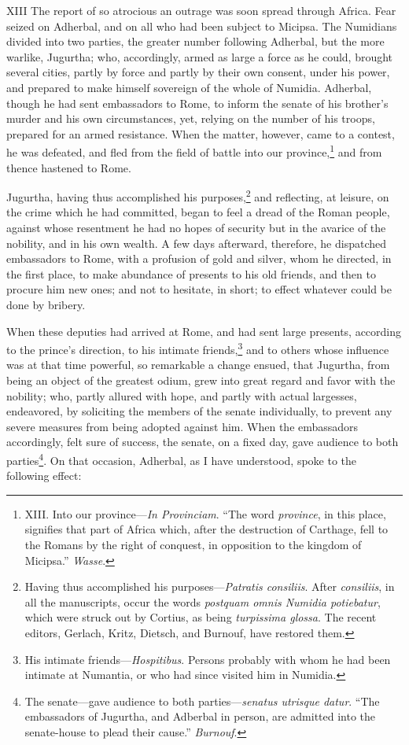 XIII The report of so atrocious an outrage was soon spread through
Africa. Fear seized on Adherbal, and on all who had been subject to
Micipsa. The Numidians divided into two parties, the greater number
following Adherbal, but the more warlike, Jugurtha; who, accordingly,
armed as large a force as he could, brought several cities, partly by
force and partly by their own consent, under his power, and prepared
to make himself sovereign of the whole of Numidia. Adherbal, though he
had sent embassadors to Rome, to inform the senate of his brother's
murder and his own circumstances, yet, relying on the number of his
troops, prepared for an armed resistance. When the matter, however,
came to a contest, he was defeated, and fled from the field of battle
into our province,\footnote{XIII. Into our province—\emph{In Provinciam}. ``The word \emph{province},
in this place, signifies that part of Africa which, after the
destruction of Carthage, fell to the Romans by the right of conquest,
in opposition to the kingdom of Micipsa.'' \emph{Wasse}.} and from thence hastened to Rome.

Jugurtha, having thus accomplished his purposes,\footnote{Having thus accomplished his purposes—\emph{Patratis consiliis}.
After \emph{consiliis}, in all the manuscripts, occur the words \emph{postquam
omnis Numidia potiebatur}, which were struck out by Cortius, as being
\emph{turpissima glossa}. The recent editors, Gerlach, Kritz, Dietsch, and
Burnouf, have restored them.} and reflecting,
at leisure, on the crime which he had committed, began to feel a dread
of the Roman people, against whose resentment he had no hopes of
security but in the avarice of the nobility, and in his own wealth. A
few days afterward, therefore, he dispatched embassadors to Rome, with
a profusion of gold and silver, whom he directed, in the first place,
to make abundance of presents to his old friends, and then to procure
him new ones; and not to hesitate, in short; to effect whatever could
be done by bribery.

When these deputies had arrived at Rome, and had sent large presents,
according to the prince's direction, to his intimate friends,\footnote{His intimate friends—\emph{Hospitibus}. Persons probably with whom
he had been intimate at Numantia, or who had since visited him in
Numidia.} and
to others whose influence was at that time powerful, so remarkable a
change ensued, that Jugurtha, from being an object of the greatest
odium, grew into great regard and favor with the nobility; who, partly
allured with hope, and partly with actual largesses, endeavored, by
soliciting the members of the senate individually, to prevent any
severe measures from being adopted against him. When the embassadors
accordingly, felt sure of success, the senate, on a fixed day, gave
audience to both parties\footnote{The senate—gave audience to both parties—\emph{senatus utrisque
datur}. ``The embassadors of Jugurtha, and Adberbal in person, are
admitted into the senate-house to plead their cause.'' \emph{Burnouf}.}. On that occasion, Adherbal, as I have
understood, spoke to the following effect:

